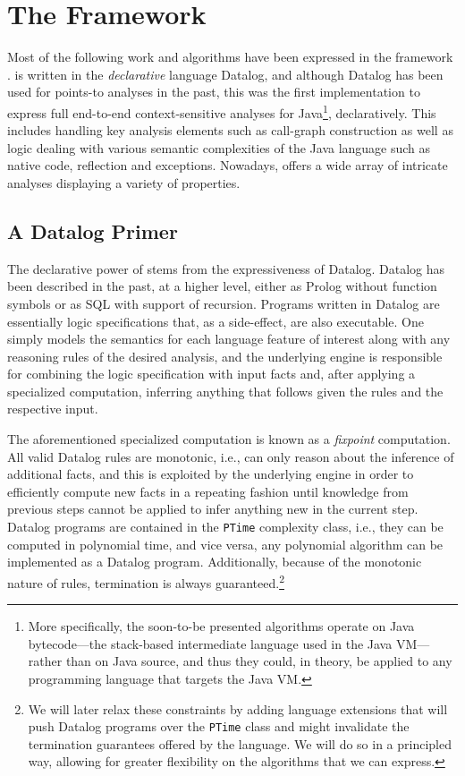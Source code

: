 \section{The \doop{} Framework}
\label{sec:back:doop}

Most of the following work and algorithms have been expressed in the \doop{} framework \cite{oopsla:2009:Bravenboer}. \doop{} is written in the \emph{declarative} language Datalog, and although Datalog has been used for points-to analyses in the past, this was the first implementation to express full end-to-end context-sensitive analyses for Java\footnote{More specifically, the soon-to-be presented algorithms operate on Java bytecode---the stack-based intermediate language used in the Java VM---rather than on Java source, and thus they could, in theory, be applied to any programming language that targets the Java VM.}, declaratively. This includes handling key analysis elements such as call-graph construction as well as logic dealing with various semantic complexities of the Java language such as native code, reflection and exceptions. Nowadays, \doop{} offers a wide array of intricate analyses displaying a variety of properties.

\subsection*{A Datalog Primer}
\label{sec:back:datalog}

The declarative power of \doop{} stems from the expressiveness of Datalog. Datalog has been described in the past, at a higher level, either as Prolog without function symbols or as SQL with support of recursion. Programs written in Datalog are essentially logic specifications that, as a side-effect, are also executable. One simply models the semantics for each language feature of interest along with any reasoning rules of the desired analysis, and the underlying engine is responsible for combining the logic specification with input facts and, after applying a specialized computation, inferring anything that follows given the rules and the respective input.

The aforementioned specialized computation is known as a \emph{fixpoint} computation. All valid Datalog rules are monotonic, i.e., can only reason about the inference of additional facts, and this is exploited by the underlying engine in order to efficiently compute new facts in a repeating fashion until knowledge from previous steps cannot be applied to infer anything new in the current step. Datalog programs are contained in the \texttt{PTime} complexity class, i.e., they can be computed in polynomial time, and vice versa, any polynomial algorithm can be implemented as a Datalog program. Additionally, because of the monotonic nature of rules, termination is always guaranteed.\footnote{We will later relax these constraints by adding language extensions that will push Datalog programs over the \texttt{PTime} class and might invalidate the termination guarantees offered by the language. We will do so in a principled way, allowing for greater flexibility on the algorithms that we can express.}


